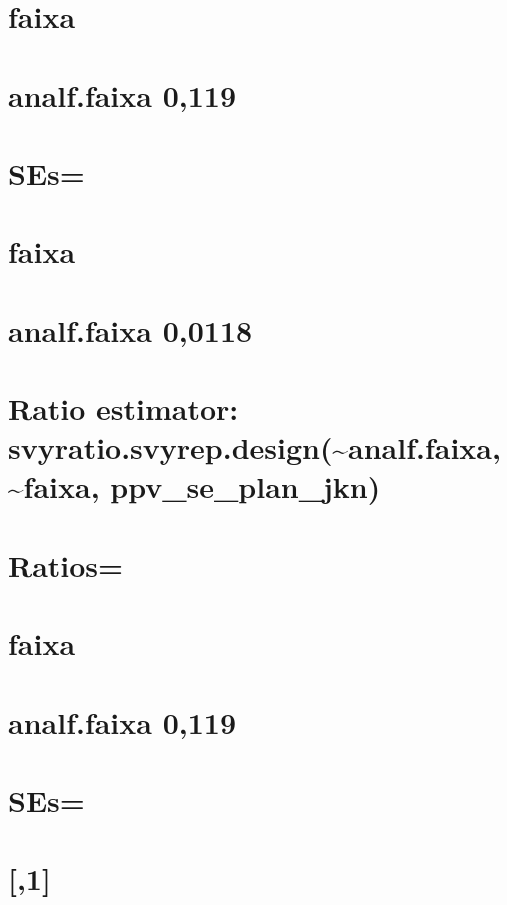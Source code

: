 \documentclass[]{book}
\theoremstyle{definition}
\theoremstyle{definition}
\theoremstyle{definition}
\theoremstyle{remark}
\begin{document}
\section{faixa}\label{faixa-1}

\section{analf.faixa 0,119}\label{analf.faixa-0119}

\section{SEs=}\label{ses}

\section{faixa}\label{faixa-2}

\section{analf.faixa 0,0118}\label{analf.faixa-00118}

\section{Ratio estimator:
svyratio.svyrep.design(\textasciitilde{}analf.faixa,
\textasciitilde{}faixa,
ppv\_se\_plan\_jkn)}\label{ratio-estimator-svyratio.svyrep.designanalf.faixa-faixa-ppv_se_plan_jkn}

\section{Ratios=}\label{ratios-1}

\section{faixa}\label{faixa-3}

\section{analf.faixa 0,119}\label{analf.faixa-0119-1}

\section{SEs=}\label{ses-1}

\section{{[},1{]}}\label{section-1}
\end{document}

